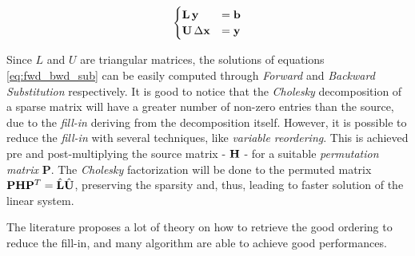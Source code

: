 \begin{equation}
    \label{eq:fwd_bwd_sub}
    \begin{cases}
        \mathbf{L}\,\mathbf{y} &= \mathbf{b} \\
        \mathbf{U}\,\Delta \mathbf{x} &= \mathbf{y}
    \end{cases}
\end{equation}

\noindent Since $L$ and $U$ are triangular matrices, the solutions of equations \ref{eq:fwd_bwd_sub} can be easily computed through \textit{Forward} and \textit{Backward Substitution} respectively. It is good to notice that the \textit{Cholesky} decomposition of a sparse matrix will have a greater number of non-zero entries than the source, due to the \textit{fill-in} deriving from the decomposition itself. However, it is possible to reduce the \textit{fill-in} with several techniques, like \textit{variable reordering}. This is achieved pre and post-multiplying the source matrix - $\mathbf{H}$ - for a suitable \textit{permutation matrix} $\mathbf{P}$. The \textit{Cholesky} factorization will be done to the permuted matrix $\mathbf{P}\mathbf{H} \mathbf{P}^T = \hat{\mathbf{L}}\hat{\mathbf{U}}$, preserving the sparsity and, thus, leading to faster solution of the linear system. 

The literature proposes a lot of theory on how to retrieve the good ordering to reduce the fill-in, and many algorithm are able to achieve good performances. 